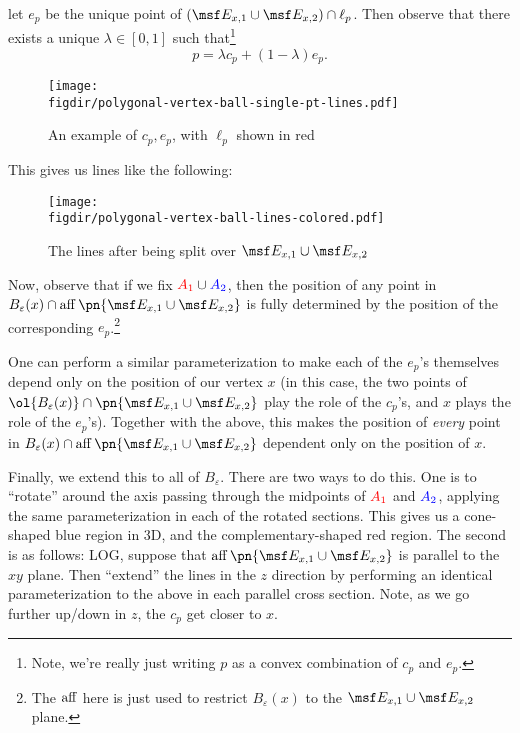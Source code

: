 \begin{sproof}
\begin{enumerate}[label=\arabic*)]
\begin{enumerate}
          let $e_p$ be the unique point of $(\msf E_{x, 1} \cup \msf
          E_{x,2}) \cap \ell_p$. Then observe that there exists a
          unique $\lambda \in [0,1]$ such
          that\footnote{\label{foot:is-just-convex-comb}Note, we're
          really just writing $p$ as a convex combination of $c_p$ and
          $e_p$.}
          \[
          p = \lambda c_p + (1 - \lambda) e_p.
          \]
      \end{enumerate}
      \begin{figure}[H]
        \centering
        \texttt{[image: \\figdir/polygonal-vertex-ball-single-pt-lines.pdf]}
        \caption{An example of $c_p, e_p$, with $\ell_p$ shown in red}
      \end{figure}
      This gives us lines like the following:
      \begin{figure}[H]
        \centering
        \texttt{[image: \\figdir/polygonal-vertex-ball-lines-colored.pdf]}
        \caption{The lines after being split over $\msf E_{x,1} \cup
          \msf E_{x,2}$}\label{fig:colored-split}
      \end{figure}
      Now, observe that if we fix ${\color{red}A_1} \cup {\color{blue}
      A_2}$, then the position of any point in $B_\varepsilon(x) \cap
      \aff\pn{\msf E_{x,1} \cup \msf E_{x,2}}$ is fully determined
      by the position of the corresponding $e_p$.\footnote{The $\operatorname{aff}$
      here is just used to restrict $B_\varepsilon(x)$ to the $\msf
      E_{x,1} \cup \msf E_{x,2}$ plane.}

      One can perform a similar parameterization to make each of the
      $e_p$'s themselves depend only on the position of our vertex $x$
      (in this case, the two points of $\ol{B_\varepsilon(x)} \cap
      \pn{\msf E_{x,1} \cup \msf E_{x,2}}$ play the role of the
      $c_p$'s, and $x$ plays the role of the $e_p$'s). Together with
      the above, this makes the position of \emph{every} point in
      $B_\varepsilon(x) \cap \aff\pn{\msf E_{x,1} \cup \msf E_{x,2}}$
      dependent only on the position of $x$.

      Finally, we extend this to all of $B_\varepsilon$. There are two
      ways to do this. One is to ``rotate'' around the axis passing
      through the midpoints of ${\color{red} A_1}$ and ${\color{blue}
      A_2}$, applying the same parameterization in each of the rotated
      sections. This gives us a cone-shaped blue region in $3$D, and
      the complementary-shaped red region. The second is as follows:
      LOG, suppose that $\aff\pn{\msf E_{x,1} \cup \msf E_{x,2}}$ is
      parallel to the $xy$ plane. Then ``extend'' the lines in the $z$
      direction by performing an identical parameterization to the
      above in each parallel cross section. Note, as we go further
      up/down in $z$, the $c_p$ get closer to $x$.


\end{enumerate}
\end{sproof}
